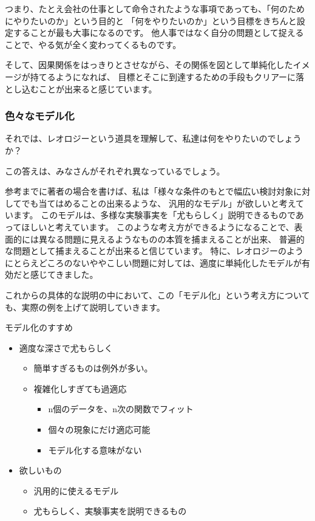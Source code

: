 \documentclass[uplatex,dvipdfmx,a4paper,11pt]{jsarticle}
\begin{document}
つまり、たとえ会社の仕事として命令されたような事項であっても、「何のためにやりたいのか」という目的と
「何をやりたいのか」という目標をきちんと設定することが最も大事になるのです。
他人事ではなく自分の問題として捉えることで、やる気が全く変わってくるものです。

そして、因果関係をはっきりとさせながら、その関係を図として単純化したイメージが持てるようになれば、
目標とそこに到達するための手段もクリアーに落とし込むことが出来ると感じています。

\subsubsection{色々なモデル化}
それでは、レオロジーという道具を理解して、私達は何をやりたいのでしょうか？

この答えは、みなさんがそれぞれ異なっているでしょう。

参考までに著者の場合を書けば、私は「様々な条件のもとで幅広い検討対象に対してでも当てはめることの出来るような、
汎用的なモデル」が欲しいと考えています。
このモデルは、多様な実験事実を「尤もらしく」説明できるものであってほしいと考えています。
このような考え方ができるようになることで、表面的には異なる問題に見えるようなものの本質を捕まえることが出来、
普遍的な問題として捕まえることが出来ると信じています。
特に、レオロジーのようにとらえどころのないややこしい問題に対しては、適度に単純化したモデルが有効だと感じてきました。

これからの具体的な説明の中において、この「モデル化」という考え方についても、実際の例を上げて説明していきます。

\large
\begin{itembox}[l]{モデル化のすすめ}
	\begin{itemize}
		\item 適度な深さで尤もらしく
			\begin{itemize}
				\item 簡単すぎるものは例外が多い。
				\item 複雑化しすぎても過適応
				\begin{itemize}
					\item n個のデータを、n次の関数でフィット
					\item 個々の現象にだけ適応可能
					\item モデル化する意味がない
				\end{itemize}
			\end{itemize}
		\item 欲しいもの
		  \begin{itemize}
			\item 汎用的に使えるモデル
			\item 尤もらしく、実験事実を説明できるもの
		  \end{itemize}
		\end{itemize}
\end{itembox}
\normalsize
\end{document}

